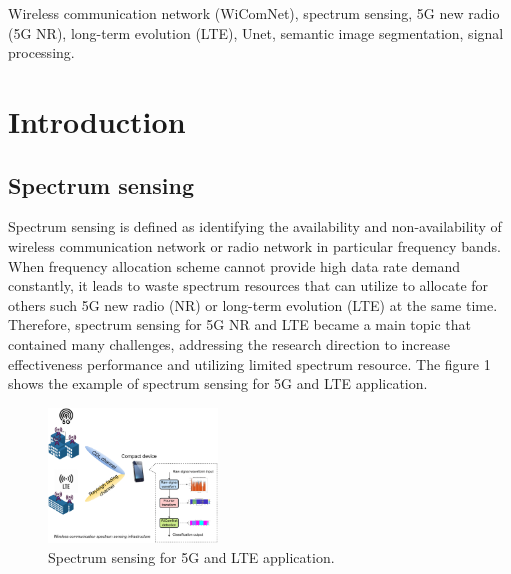 \documentclass[journal]{IEEEtran} %
\begin{document}
\begin{IEEEkeywords}
    Wireless communication network (WiComNet), spectrum sensing, 5G new radio (5G NR), long-term evolution (LTE), Unet, semantic image segmentation, signal processing.
\end{IEEEkeywords}

\section{Introduction}

\subsection{Spectrum sensing}
Spectrum sensing is defined as identifying the availability and non-availability of wireless communication network or radio network in particular frequency bands. When frequency allocation scheme cannot provide high data rate demand constantly, it leads to waste spectrum resources that can utilize to allocate for others such 5G new radio (NR) or long-term evolution (LTE) at the same time. Therefore, spectrum sensing for 5G NR and LTE became a main topic that contained many challenges, addressing the research direction to increase effectiveness performance and utilizing limited spectrum resource. The figure 1 shows the example of spectrum sensing for 5G and LTE application.

\begin{figure}[h]
    \centering
    \includegraphics[width=0.4\textwidth]{img/Design-Overview.jpg}
    \caption{Spectrum sensing for 5G and LTE application.}
    \label{fig1}
\end{figure}
\end{document}
